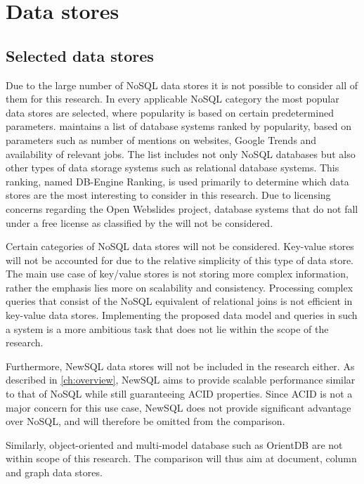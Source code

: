 \chapter{Data stores}
\label{ch:data-stores}

\section{Selected data stores}
\label{sec:selected-data-stores}

Due to the large number of NoSQL data stores it is not possible to consider all of them for this research. In every applicable NoSQL category the most popular data stores are selected, where popularity is based on certain predetermined parameters. \textcite{DBEngine2018} maintains a list of database systems ranked by popularity, based on parameters such as number of mentions on websites, Google Trends and availability of relevant jobs. The list includes not only NoSQL databases but also other types of data storage systems such as relational database systems. This ranking, named DB-Engine Ranking, is used primarily to determine which data stores are the most interesting to consider in this research. Due to licensing concerns regarding the Open Webslides project, database systems that do not fall under a free license as classified by the \textcite{FreeSoftwareFoundation1985} will not be considered.

Certain categories of NoSQL data stores will not be considered. Key-value stores will not be accounted for due to the relative simplicity of this type of data store. The main use case of key/value stores is not storing more complex information, rather the emphasis lies more on scalability and consistency. Processing complex queries that consist of the NoSQL equivalent of relational joins is not efficient in key-value data stores. Implementing the proposed data model and queries in such a system is a more ambitious task that does not lie within the scope of the research.

Furthermore, NewSQL data stores will not be included in the research either. As described in \cref{ch:overview}, NewSQL aims to provide scalable performance similar to that of NoSQL while still guaranteeing ACID properties. Since ACID is not a major concern for this use case, NewSQL does not provide significant advantage over NoSQL, and will therefore be omitted from the comparison.

Similarly, object-oriented and multi-model database such as OrientDB \autocite{OrientDB2010} are not within scope of this research. The comparison will thus aim at document, column and graph data stores.

